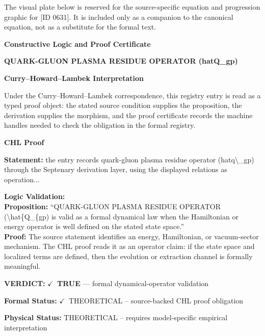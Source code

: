 \begingroup\footnotesize\sloppy
The visual plate below is reserved for the source-specific equation and progression graphic for [ID 0631]. It is included only as a companion to the canonical equation, not as a substitute for the formal text.
\par\endgroup
\ifTZPDarkEdition
{}
\fi

\clearpage
\begingroup\tzpsupportsetup
\noindent\textbf{\fontsize{10.8pt}{12.8pt}\selectfont [ID 0631] Constructive Logic and Proof Certificate}\par
\noindent\textbf{\fontsize{10pt}{12pt}\selectfont QUARK-GLUON PLASMA RESIDUE OPERATOR (hatQ\_gp)}\par
\vspace{0.45em}
\begingroup
\footnotesize
\setlength{\parskip}{0.22em}
\setlength{\parindent}{0pt}
\noindent\textbf{Curry--Howard--Lambek Interpretation}\par
Under the Curry--Howard--Lambek correspondence, this registry entry is read as a typed proof
object: the stated source condition supplies the proposition, the derivation supplies the
morphism, and the proof certificate records the machine handles needed to check the obligation
in the formal registry.

\vspace{0.45em}
\noindent\textbf{CHL Proof}\par
\textbf{Statement:} the entry records quark-gluon plasma residue operator (hatq\textbackslash{}\_gp) through the Septenary
derivation layer, using the displayed relations as operation...

\textbf{Logic Validation:}\\
\textbf{Proposition:} ``QUARK-GLUON PLASMA RESIDUE OPERATOR (\textbackslash{}hat\{Q\_\{gp) is valid as a formal dynamical law
when the Hamiltonian or energy operator is well defined on the stated state space.''\\
\textbf{Proof:} The source statement identifies an energy, Hamiltonian, or vacuum-sector mechanism. The
CHL proof reads it as an operator claim: if the state space and localized terms are
defined, then the evolution or extraction channel is formally meaningful.

\textbf{VERDICT:} \ensuremath{\checkmark}\ \textbf{TRUE} --- formal dynamical-operator validation

\textbf{Formal Status:} \ensuremath{\checkmark}\ THEORETICAL -- source-backed CHL proof obligation

\textbf{Physical Status:} THEORETICAL -- requires model-specific empirical interpretation
\par\vspace{0.45em}
\par
\ifTZPDarkEdition
{}
\fi
\endgroup
\endgroup
